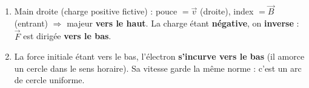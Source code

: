 \documentclass[11pt,a4paper]{article}
\newcommand{\vv}[1]{\vec{#1}}\newcommand{\ds}{\displaystyle}
\begin{document}
\begin{corrige}
\begin{enumerate}[label=\alph*)]
  \item Main droite (charge positive fictive) : pouce $=\vv{v}$ (droite), index $=\vv{B}$ (entrant)
        $\Rightarrow$ majeur \textbf{vers le haut}. La charge étant \textbf{négative}, on \textbf{inverse} :
        $\vv{F}$ est dirigée \textbf{vers le bas}.
  \item La force initiale étant vers le bas, l'électron \textbf{s'incurve vers le bas} (il amorce un
        cercle dans le sens horaire). Sa vitesse garde la même norme : c'est un arc de cercle uniforme.
\end{enumerate}
\end{corrige}
\end{document}
